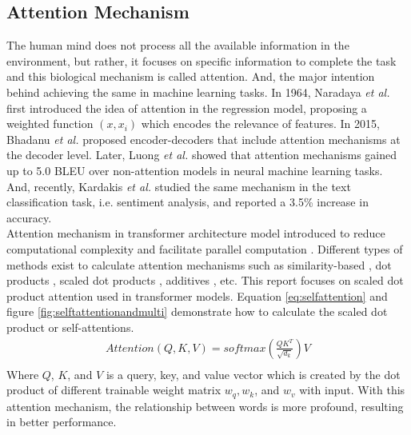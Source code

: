 \documentclass[%
	BCOR=8mm, %
	DIV=12,
	toc=bibliography, %
	toc=listof, %
	oneside, %
	egregdoesnotlikesansseriftitles, %
	]{scrbook}
\begin{document}
\subsection{Attention Mechanism}
The human mind does not process all the available information in the environment, but rather, it focuses on specific information to complete the task and this biological mechanism is called attention. And, the major intention behind achieving the same in machine learning tasks. In 1964, Naradaya \textit{et al.} \cite{nadaraya_estimating_1964} first introduced the idea of attention in the regression model, proposing a weighted function $(x,x_{i})$ which encodes the relevance of features. In 2015, Bhadanu \textit{et al.} \cite{bahdanau_neural_2015} proposed encoder-decoders that include attention mechanisms at the decoder level. Later, Luong \textit{et al.} \cite{luong_effective_2015} showed that attention mechanisms gained up to 5.0 BLEU over non-attention models in neural machine learning tasks. And, recently, Kardakis \textit{et al.} \cite{kardakis_examining_2021} studied the same mechanism in the text classification task, i.e. sentiment analysis, and reported a 3.5\% increase in accuracy.\\
Attention mechanism in transformer architecture model introduced to reduce computational complexity and facilitate parallel computation \cite{vaswani_attention_2017}. Different types of methods exist to calculate attention mechanisms such as similarity-based \cite{graves_neural_2014}, dot products \cite{luong_effective_2015}, scaled dot products \cite{vaswani_attention_2017}, additives \cite{bahdanau_neural_2015}, etc. This report focuses on scaled dot product attention used in transformer models. Equation  \ref{eq:selfattention} and figure \ref{fig:selftattentionandmulti} demonstrate how to calculate the scaled dot product or self-attentions.
\begin{equation}
    \begin{aligned}
        Attention(Q,K,V)=softmax(\frac{QK^T}{\sqrt{d_{k}}})V\\
        \label{eq:selfattention}
    \end{aligned}
\end{equation}
Where $Q$, $K$, and $V$ is a query, key, and value vector which is created  by the dot product of different trainable weight matrix $w_{q},w_{k}$, and $ w_{v}$ with input. With this attention mechanism, the relationship between words is more profound, resulting in better performance.\\
\end{document}
